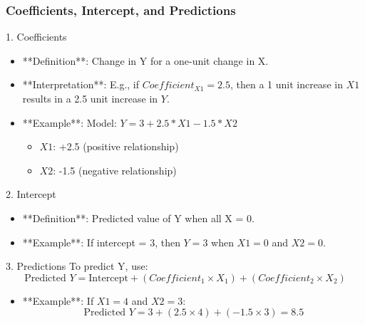 \documentclass[aspectratio=169]{beamer}
\begin{document}
\begin{frame}[fragile]
    \frametitle{Coefficients, Intercept, and Predictions}
    \begin{block}{1. Coefficients}
        \begin{itemize}
            \item **Definition**: Change in Y for a one-unit change in X.
            \item **Interpretation**: E.g., if $Coefficient_{X1} = 2.5$, then a 1 unit increase in $X1$ results in a 2.5 unit increase in $Y$.
            \item **Example**: Model: $Y = 3 + 2.5*X1 - 1.5*X2$
            \begin{itemize}
                \item $X1$: +2.5 (positive relationship)
                \item $X2$: -1.5 (negative relationship)
            \end{itemize}
        \end{itemize}
    \end{block}
    
    \begin{block}{2. Intercept}
        \begin{itemize}
            \item **Definition**: Predicted value of Y when all X = 0.
            \item **Example**: If intercept = 3, then $Y=3$ when $X1=0$ and $X2=0$.
        \end{itemize}
    \end{block}
    
    \begin{block}{3. Predictions}
        To predict Y, use:
        \begin{equation}
            \text{Predicted } Y = \text{Intercept} + (Coefficient_{1} \times X_{1}) + (Coefficient_{2} \times X_{2}) 
        \end{equation}
        \begin{itemize}
            \item **Example**: If $X1 = 4$ and $X2 = 3$:
            \begin{equation}
                \text{Predicted } Y = 3 + (2.5 \times 4) + (-1.5 \times 3) = 8.5 
            \end{equation}
        \end{itemize}
    \end{block}
\end{frame}
\end{document}

